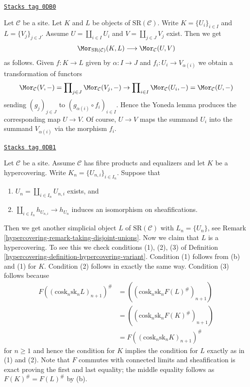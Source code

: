 \begin{remark}
\label{hypercovering-remark-taking-disjoint-unions}
\href{https://stacks.math.columbia.edu/tag/0DB0}{\texttt{Stacks tag 0DB0}}

Let $\mathcal{C}$ be a site. Let
$K$ and $L$ be objects of $\text{SR}(\mathcal{C})$.
Write $K = \{U_i\}_{i \in I}$ and $L = \{V_j\}_{j \in J}$.
Assume $U = \coprod_{i \in I} U_i$ and $V = \coprod_{j \in J} V_j$
exist. Then we get
$$
\Mor_{\text{SR}(\mathcal{C})}(K, L) \longrightarrow \Mor_\mathcal{C}(U, V)
$$
as follows. Given $f : K \to L$ given by $\alpha : I \to J$
and $f_i : U_i \to V_{\alpha(i)}$ we obtain a transformation of functors
$$
\Mor_\mathcal{C}(V, -) =
\prod\nolimits_{j \in J} \Mor_\mathcal{C}(V_j, -)
\to
\prod\nolimits_{i \in I} \Mor_\mathcal{C}(U_i, -) =
\Mor_\mathcal{C}(U, -)
$$
sending $(g_j)_{j \in J}$ to
$(g_{\alpha(i)} \circ f_i)_{i \in I}$. Hence the Yoneda lemma
produces the corresponding map $U \to V$. Of course, $U \to V$
maps the summand $U_i$ into the summand $V_{\alpha(i)}$ via
the morphism $f_i$.
\end{remark}

\begin{remark}
\label{hypercovering-remark-take-unions-hypercovering}
\href{https://stacks.math.columbia.edu/tag/0DB1}{\texttt{Stacks tag 0DB1}}

Let $\mathcal{C}$ be a site. Assume $\mathcal{C}$ has
fibre products and equalizers and let $K$ be a hypercovering.
Write $K_n = \{U_{n, i}\}_{i \in I_n}$. Suppose that
\begin{enumerate}
\item[(a)] $U_n = \coprod_{i \in I_n} U_{n, i}$ exists, and
\item[(b)] $\coprod_{i \in I_n} h_{U_{n, i}} \to h_{U_n}$ induces
an isomorphism on sheafifications.
\end{enumerate}
Then we get another simplicial object $L$ of $\text{SR}(\mathcal{C})$
with $L_n = \{U_n\}$, see
Remark \ref{hypercovering-remark-taking-disjoint-unions}.
Now we claim that $L$ is a hypercovering.
To see this we check conditions (1), (2), (3) of
Definition \ref{hypercovering-definition-hypercovering-variant}.
Condition (1) follows from (b) and (1) for $K$.
Condition (2) follows in exactly the same way.
Condition (3) follows because
\begin{align*}
F((\text{cosk}_n \text{sk}_n L)_{n + 1})^\#
& =
((\text{cosk}_n \text{sk}_n F(L)^\#)_{n + 1}) \\
& =
((\text{cosk}_n \text{sk}_n F(K)^\#)_{n + 1}) \\
& =
F((\text{cosk}_n \text{sk}_n K)_{n + 1})^\#
\end{align*}
for $n \geq 1$ and hence the condition for $K$ implies the condition for
$L$ exactly as in (1) and (2).
Note that $F$ commutes with connected limits and sheafification is exact
proving the first and last equality; the middle equality follows as
$F(K)^\# = F(L)^\#$ by (b).
\end{remark}

